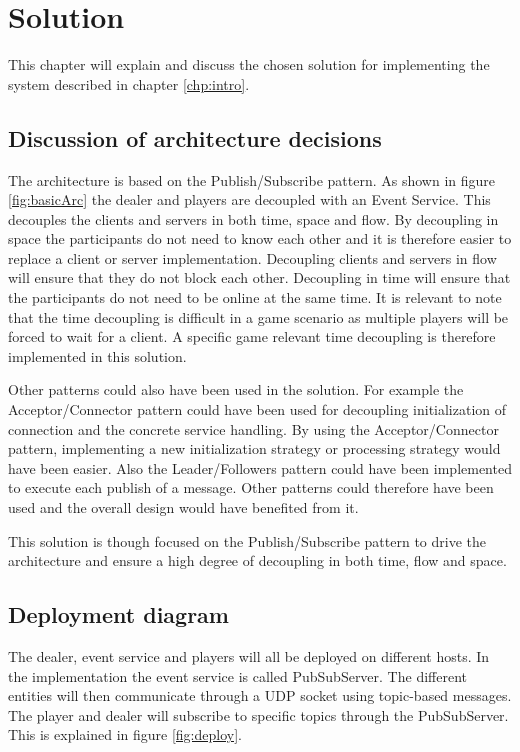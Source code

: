 \chapter{Solution}
This chapter will explain and discuss the chosen solution for implementing the system described in chapter \ref{chp:intro}.

\section{Discussion of architecture decisions}
The architecture is based on the Publish/Subscribe pattern. As shown in figure \ref{fig:basicArc} the dealer and players are decoupled with an Event Service. This decouples the clients and servers in both time, space and flow. By decoupling in space the participants do not need to know each other and it is therefore easier to replace a client or server implementation. Decoupling clients and servers in flow will ensure that they do not block each other. Decoupling in time will ensure that the participants do not need to be online at the same time. It is relevant to note that the time decoupling is difficult in a game scenario as multiple players will be forced to wait for a client. A specific game relevant time decoupling is therefore implemented in this solution.

Other patterns could also have been used in the solution. For example the Acceptor/Connector pattern could have been used for decoupling initialization of connection and the concrete service handling. By using the Acceptor/Connector pattern, implementing a new initialization strategy or processing strategy would have been easier. Also the Leader/Followers pattern could have been implemented to execute each publish of a message. Other patterns could therefore have been used and the overall design would have benefited from it.

This solution is though focused on the Publish/Subscribe pattern to drive the architecture and ensure a high degree of decoupling in both time, flow and space. 

\section{Deployment diagram}
The dealer, event service and players will all be deployed on different hosts. In the implementation the event service is called PubSubServer. The different entities will then communicate through a UDP socket using topic-based messages. The player and dealer will subscribe to specific topics through the PubSubServer. This is explained in figure \ref{fig:deploy}.

